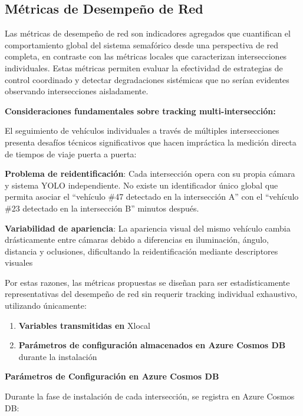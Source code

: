 \documentclass[12pt,a4paper,oneside]{report}
\begin{document}
\subsection{Métricas de Desempeño de Red}\label{muxe9tricas-de-desempeuxf1o-de-red}

Las métricas de desempeño de red son indicadores agregados que cuantifican el comportamiento global del sistema semafórico desde una perspectiva de red completa, en contraste con las métricas locales que caracterizan intersecciones individuales. Estas métricas permiten evaluar la efectividad de estrategias de control coordinado y detectar degradaciones sistémicas que no serían evidentes observando intersecciones aisladamente.

\textbf{Consideraciones fundamentales sobre tracking multi-intersección:}

El seguimiento de vehículos individuales a través de múltiples intersecciones presenta desafíos técnicos significativos que hacen impráctica la medición directa de tiempos de viaje puerta a puerta:

\textbf{Problema de reidentificación}: Cada intersección opera con su propia cámara y sistema YOLO independiente. No existe un identificador único global que permita asociar el ``vehículo \#47 detectado en la intersección A'' con el ``vehículo \#23 detectado en la intersección B'' minutos después.

\textbf{Variabilidad de apariencia}: La apariencia visual del mismo vehículo cambia drásticamente entre cámaras debido a diferencias en iluminación, ángulo, distancia y oclusiones, dificultando la reidentificación mediante descriptores visuales

Por estas razones, las métricas propuestas se diseñan para ser estadísticamente representativas del desempeño de red sin requerir tracking individual exhaustivo, utilizando únicamente:

\begin{enumerate}
\def\labelenumi{\arabic{enumi}.}
\item
  \textbf{Variables transmitidas en} Xlocal
\item
  \textbf{Parámetros de configuración almacenados en Azure Cosmos DB} durante la instalación
\end{enumerate}

\textbf{Parámetros de Configuración en Azure Cosmos DB}

Durante la fase de instalación de cada intersección, se registra en Azure Cosmos DB:
\end{document}
